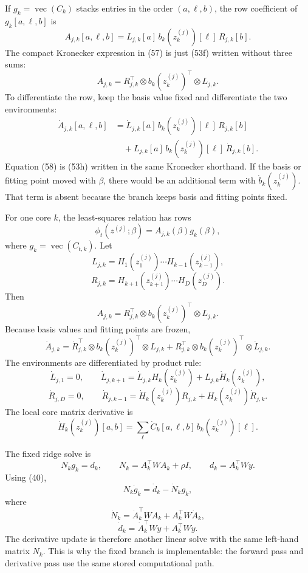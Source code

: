 \documentclass[11pt]{article}
\newcommand{\vecop}{\operatorname{vec}}
\begin{document}
If \(g_k=\vecop(C_k)\) stacks entries in the order \((a,\ell,b)\), the row
coefficient of \(g_k[a,\ell,b]\) is
\[
    A_{j,k}[a,\ell,b]
    =
    L_{j,k}[a]\,
    b_k(z_k^{(j)})[\ell]\,
    R_{j,k}[b].
    \tag{P19-53f}
\]
The compact Kronecker expression in (57) is just (53f) written without three
sums:
\[
    A_{j,k}
    =
    R_{j,k}^{\top}\otimes b_k(z_k^{(j)})^\top\otimes L_{j,k}.
    \tag{P19-53g}
\]
To differentiate the row, keep the basis value fixed and differentiate the
two environments:
\[
\begin{aligned}
    \dot A_{j,k}[a,\ell,b]
    &=
    \dot L_{j,k}[a]\,
    b_k(z_k^{(j)})[\ell]\,
    R_{j,k}[b]\\
    &\quad+
    L_{j,k}[a]\,
    b_k(z_k^{(j)})[\ell]\,
    \dot R_{j,k}[b].
\end{aligned}
    \tag{P19-53h}
\]
Equation (58) is (53h) written in the same Kronecker shorthand.  If the basis
or fitting point moved with \(\beta\), there would be an additional term with
\(\dot b_k(z_k^{(j)})\).  That term is absent because the branch keeps basis
and fitting points fixed.

For one core \(k\), the least-squares relation has rows
\[
    \phi_t(z^{(j)};\beta)=A_{j,k}(\beta)g_k(\beta),
    \tag{P19-54}
\]
where \(g_k=\vecop(C_{t,k})\).  Let
\[
    L_{j,k}
    =
    H_{1}(z_1^{(j)})\cdots H_{k-1}(z_{k-1}^{(j)}),
    \tag{P19-55}
\]
\[
    R_{j,k}
    =
    H_{k+1}(z_{k+1}^{(j)})\cdots H_D(z_D^{(j)}).
    \tag{P19-56}
\]
Then
\[
    A_{j,k}
    =
    R_{j,k}^{\top}\otimes b_k(z_k^{(j)})^\top\otimes L_{j,k}.
    \tag{P19-57}
\]
Because basis values and fitting points are frozen,
\[
    \dot A_{j,k}
    =
    \dot R_{j,k}^{\top}\otimes b_k(z_k^{(j)})^\top\otimes L_{j,k}
    +
    R_{j,k}^{\top}\otimes b_k(z_k^{(j)})^\top\otimes \dot L_{j,k}.
    \tag{P19-58}
\]
The environments are differentiated by product rule:
\[
    \dot L_{j,1}=0,
    \qquad
    \dot L_{j,k+1}
    =
    \dot L_{j,k}H_k(z_k^{(j)})
    +
    L_{j,k}\dot H_k(z_k^{(j)}),
    \tag{P19-59}
\]
\[
    \dot R_{j,D}=0,
    \qquad
    \dot R_{j,k-1}
    =
    \dot H_k(z_k^{(j)})R_{j,k}
    +
    H_k(z_k^{(j)})\dot R_{j,k}.
    \tag{P19-60}
\]
The local core matrix derivative is
\[
    \dot H_k(z_k^{(j)})[a,b]
    =
    \sum_{\ell}
    \dot C_k[a,\ell,b]\,b_k(z_k^{(j)})[\ell].
    \tag{P19-61}
\]

The fixed ridge solve is
\[
    N_k g_k=d_k,
    \qquad
    N_k=A_k^\top W A_k+\rho I,
    \qquad
    d_k=A_k^\top W y.
    \tag{P19-62}
\]
Using (40),
\[
    N_k\dot g_k=\dot d_k-\dot N_k g_k,
    \tag{P19-63}
\]
where
\[
    \dot N_k=\dot A_k^\top W A_k+A_k^\top W\dot A_k,
    \tag{P19-64}
\]
\[
    \dot d_k=\dot A_k^\top W y+A_k^\top W\dot y.
    \tag{P19-65}
\]
The derivative update is therefore another linear solve with the same
left-hand matrix \(N_k\).  This is why the fixed branch is implementable: the
forward pass and derivative pass use the same stored computational path.
\end{document}
